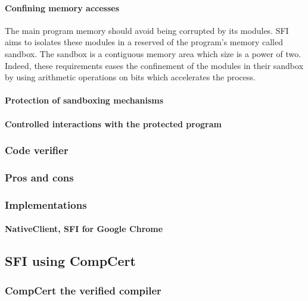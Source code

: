 \documentclass[11pt]{sdm}
\begin{document}
\paragraph{Confining memory accesses}
\label{par:Confining memory accesses}
The main program memory should avoid being corrupted by its modules. SFI aims to isolates these modules in a reserved of the program's memory called sandbox.
The sandbox is a contiguous memory area which size is a power of two. Indeed, these requirements eases the confinement of the modules in their sandbox by using arithmetic operations on bits which accelerates the process.
\paragraph{Protection of sandboxing mechanisms}
\label{par:Protection of sandboxing mechanisms}
\paragraph{Controlled interactions with the protected program}
\label{par:Controled interactions with the protected program}

\subsubsection{Code verifier}
\label{ssub:Code verifier}

\subsubsection{Pros and cons}
\label{ssub:Pros and cons}

\subsubsection{Implementations}
\label{ssub:Implementations}
\paragraph{NativeClient, SFI for Google Chrome}
\label{par:NativeClient, SFI for Google Chrome}


\subsection{SFI using CompCert}

\subsubsection{CompCert the verified compiler}
\label{ssub:CompCert the verified compiler}
\end{document}
